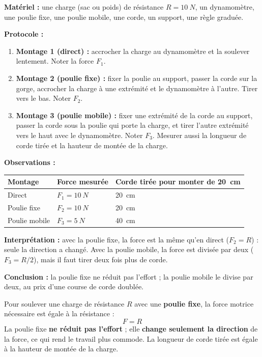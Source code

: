 \documentclass[11pt]{article}
\begin{document}
\begin{experience}
\textbf{Matériel :} une charge (sac ou poids) de résistance $R = \SI{10}{N}$, un dynamomètre, une poulie fixe, une poulie mobile, une corde, un support, une règle graduée.

\textbf{Protocole :}
\begin{enumerate}
\item \textbf{Montage 1 (direct) :} accrocher la charge au dynamomètre et la soulever lentement. Noter la force $F_1$.
\item \textbf{Montage 2 (poulie fixe) :} fixer la poulie au support, passer la corde sur la gorge, accrocher la charge à une extrémité et le dynamomètre à l'autre. Tirer vers le bas. Noter $F_2$.
\item \textbf{Montage 3 (poulie mobile) :} fixer une extrémité de la corde au support, passer la corde sous la poulie qui porte la charge, et tirer l'autre extrémité vers le haut avec le dynamomètre. Noter $F_3$. Mesurer aussi la longueur de corde tirée et la hauteur de montée de la charge.
\end{enumerate}

\textbf{Observations :}
\begin{center}
\begin{tabularx}{\linewidth}{|l|X|X|}
\hline
\rowcolor{popblueL} \textbf{Montage} & \textbf{Force mesurée} & \textbf{Corde tirée pour monter de \SI{20}{cm}} \\
\hline
Direct & $F_1 = \SI{10}{N}$ & \SI{20}{cm} \\
\hline
Poulie fixe & $F_2 = \SI{10}{N}$ & \SI{20}{cm} \\
\hline
Poulie mobile & $F_3 = \SI{5}{N}$ & \SI{40}{cm} \\
\hline
\end{tabularx}
\end{center}

\textbf{Interprétation :} avec la poulie fixe, la force est la même qu'en direct ($F_2 = R$) : seule la direction a changé. Avec la poulie mobile, la force est divisée par deux ($F_3 = R/2$), mais il faut tirer deux fois plus de corde.

\textbf{Conclusion :} la poulie fixe ne réduit pas l'effort ; la poulie mobile le divise par deux, au prix d'une course de corde doublée.
\end{experience}

\begin{propriete}
Pour soulever une charge de résistance $R$ avec une \textbf{poulie fixe}, la force motrice nécessaire est égale à la résistance :
\[ F = R \]
La poulie fixe \textbf{ne réduit pas l'effort} ; elle \textbf{change seulement la direction} de la force, ce qui rend le travail plus commode. La longueur de corde tirée est égale à la hauteur de montée de la charge.
\end{propriete}
\end{document}
